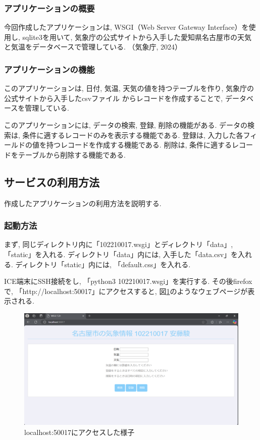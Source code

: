 \documentclass{ltjsarticle} %
\begin{document}
\subsubsection{アプリケーションの概要}
今回作成したアプリケーションは, WSGI（Web Server Gateway Interface）を使用し, sqlite3を用いて, 
気象庁の公式サイトから入手した愛知県名古屋市の天気と気温をデータベースで管理している. 
（気象庁, 2024）

\subsubsection{アプリケーションの機能}
このアプリケーションは, 日付, 気温, 天気の値を持つテーブルを作り, 気象庁の公式サイトから入手したcsvファイル
からレコードを作成することで, データベースを管理している. 

このアプリケーションには, データの検索, 登録, 削除の機能がある. 
データの検索は, 条件に適するレコードのみを表示する機能である. 
登録は, 入力した各フィールドの値を持つレコードを作成する機能である. 
削除は, 条件に適するレコードをテーブルから削除する機能である. 


\subsection{サービスの利用方法}
作成したアプリケーションの利用方法を説明する. 

\subsubsection{起動方法}
まず, 同じディレクトリ内に「102210017.wsgi」とディレクトリ「data」,「static」を入れる. 
ディレクトリ「data」内には, 入手した「data.csv」を入れる. 
ディレクトリ「static」内には, 「default.css」を入れる. 

ICE端末にSSH接続をし, 「python3 102210017.wsgi」を実行する. 
その後firefoxで, 「http://localhost:50017」にアクセスすると, 図\ref{fig:1}のようなウェブページが表示される. 

\begin{figure}[H] %
  \centering
  \includegraphics[width=1.0\textwidth]{1.png} %
  \caption{localhost:50017にアクセスした様子} %
  \label{fig:1} %
\end{figure}
\end{document}

